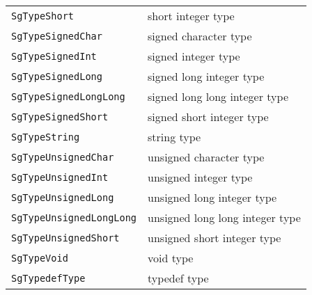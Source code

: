 \begin{longtable}[l]{l|p{10cm}}
 \texttt{SgTypeShort}& short integer type\\
 \texttt{SgTypeSignedChar}& signed character type\\
 \texttt{SgTypeSignedInt}& signed integer type\\
 \texttt{SgTypeSignedLong}& signed long integer type\\
 \texttt{SgTypeSignedLongLong}& signed long long integer type\\
 \texttt{SgTypeSignedShort}& signed short integer type\\
 \texttt{SgTypeString}& string type\\
 \texttt{SgTypeUnsignedChar}&unsigned character type\\
 \texttt{SgTypeUnsignedInt}&unsigned integer type\\
 \texttt{SgTypeUnsignedLong}&unsigned long integer type\\
 \texttt{SgTypeUnsignedLongLong}&unsigned long long integer type\\
 \texttt{SgTypeUnsignedShort}&unsigned short integer type\\
 \texttt{SgTypeVoid}&void type\\
 \texttt{SgTypedefType}&typedef type\\
\end{longtable}


